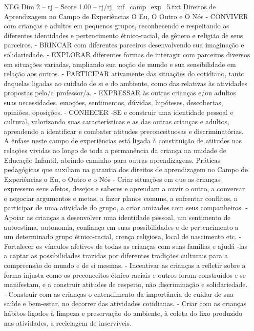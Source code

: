 \begin{textsample}{NEG Dim 2 – rj – Score 1.00 – rj/rj\_inf\_camp\_exp\_5.txt}  \label{ex:f2_neg_058}
Direitos de Aprendizagem no Campo de Experiências O Eu, O Outro e O Nós - CONVIVER com crianças e adultos em pequenos grupos, reconhecendo e respeitando as diferentes identidades e pertencimento étnico-racial, de gênero e religião de seus parceiros. - BRINCAR com diferentes parceiros desenvolvendo sua imaginação e solidariedade. - EXPLORAR diferentes formas de interagir com parceiros diversos em situações variadas, ampliando sua noção de mundo e sua sensibilidade em relação aos outros. - PARTICIPAR ativamente das situações do cotidiano, tanto daquelas ligadas ao cuidado de si e do ambiente, como das relativas às atividades propostas pelo/a professor/a. - EXPRESSAR às outras crianças e/ou adultos suas necessidades, emoções, sentimentos, dúvidas, hipóteses, descobertas, opiniões, oposições. - CONHECER -SE e construir uma identidade pessoal e cultural, valorizando suas características e as das outras crianças e adultos, aprendendo a identificar e combater atitudes preconceituosas e discriminatórias.
A ênfase neste campo de experiências está ligada à constituição de atitudes nas relações vividas ao longo de toda a permanência da criança na unidade de Educação Infantil, abrindo caminho para outras aprendizagens.
Práticas pedagógicas que auxiliam na garantia dos direitos de aprendizagem no Campo de Experiências o Eu, o Outro e o Nós - Criar situações em que as crianças expressem seus afetos, desejos e saberes e aprendam a ouvir o outro, a conversar e negociar argumentos e metas, a fazer planos comuns, a enfrentar conflitos, a participar de uma atividade do grupo, a criar amizades com seus companheiros. - Apoiar as crianças a desenvolver uma identidade pessoal, um sentimento de autoestima, autonomia, confiança em suas possibilidades e de pertencimento a um determinado grupo étnico-racial, crença religiosa, local de nascimento etc. - Fortalecer os vínculos afetivos de todas as crianças com suas famílias e ajudá -las a captar as possibilidades trazidas por diferentes tradições culturais para a compreensão do mundo e de si mesmas. - Incentivar as crianças a refletir sobre a forma injusta como os preconceitos étnico-raciais e outros foram construídos e se manifestam, e a construir atitudes de respeito, não discriminação e solidariedade. - Construir com as crianças o entendimento da importância de cuidar de sua saúde e bem-estar, no decorrer das atividades cotidianas. - Criar com as crianças hábitos ligados à limpeza e preservação do ambiente, à coleta do lixo produzido nas atividades, à reciclagem de inservíveis.

\end{textsample}
